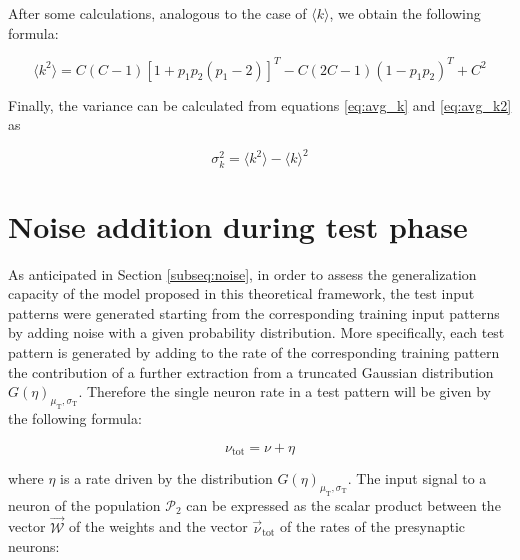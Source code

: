 \documentclass[a4paper, 12pt, twoside, openright]{book}
\newcommand{\popII}{\mathcal{P}_2}
\begin{document}
After some calculations, analogous to the case of
$\langle k \rangle $, we obtain the following formula:

\begin{equation}
\label{eq:avg_k2}
    \langle k^2 \rangle= C(C-1) [1+ p_1 p_2 (p_1 - 2)]^T
    - C (2C - 1) (1 - p_1 p_2)^T + C^2
\end{equation}

Finally, the variance can be calculated from equations
\eqref{eq:avg_k} and \eqref{eq:avg_k2} as

\begin{equation}
    \sigma_{k}^{2} = \langle k^2 \rangle 
    - \langle k \rangle^2 
\end{equation}

\chapter{Noise addition during test phase}
\label{app:noise}
As anticipated in Section \ref{subseq:noise}, in order to assess the generalization capacity of the model proposed in this theoretical framework, the test input patterns were generated starting from the corresponding training input patterns by adding noise with a given probability distribution.
More specifically, each test pattern is generated by adding to the rate of the corresponding training pattern the contribution of a further extraction from
a truncated Gaussian distribution
$G(\eta)_{\mu_{\text{T}}, \sigma_{\text{T}}}$.
 Therefore the single neuron rate in a test pattern will be given by the following formula:

\begin{equation}
    \nu_{\text{tot}} = \nu + \eta
\end{equation}

where $\eta$ is a rate driven by the distribution $G(\eta)_{\mu_{\text{T}}, \sigma_{\text{T}}}$.
The input signal to a neuron of the population $\popII$ can be expressed as the scalar product between the vector 
$\vec{\mathcal{W}}$ of the weights and the vector
$\vec{\nu}_{\text{tot}}$ of the rates of the presynaptic neurons:
\end{document}
